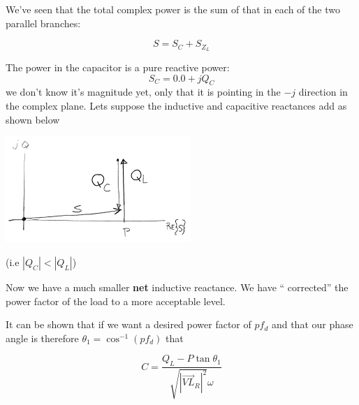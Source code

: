 We've seen that the total complex
power is the sum of that in each of the two parallel branches:

\[
S = S_C + S_{Z_L}
\]

The power in the capacitor is a pure reactive power:
\[
S_C = 0.0 + j Q_C
\]
we don't know it's magnitude yet, only that it is pointing in the $-j$ direction
in the complex plane.   Lets suppose the inductive and capacitive reactances add
as shown below

\includegraphics[width=70mm]{figsChapt03/MF77903.png}

(i.e $|Q_C| < |Q_L|$)

Now we have a much smaller {\bf net} inductive reactance.   We have `` corrected''
the power factor of the load to a more acceptable level.

It can be shown that  if we want a desired power factor of $pf_d$ and that our phase
angle is therefore $\theta_1 = \cos^{-1}(pf_d)$ that

\[
C = \frac{Q_L - P \tan \theta_1}{\sqrt{|\vec{VL}_R|^2} \omega}
\]
%
%
%
%
%
%
%
%
%
%
%
%
%
%
%

%



